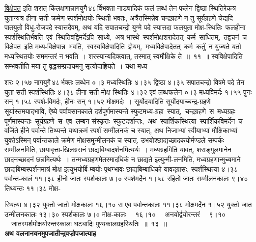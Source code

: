 \documentclass[11pt, openany]{book}
\begin{document}
\hyperref[4.11.1]{विक्षेपत} इति शरात् किंलक्षणान्नागयुगै\textendash \,४८\textendash \,र्विभक्ता नाड्यादिकं फलं लब्धं तेन फलेन द्विष्ठा स्थितिरेकत्र युतान्यत्र हीना सती क्रमेण स्पर्शमोक्षयोः स्थिती भवतः, अत्रैतस्मिन्नेव चन्द्रग्रहणे न तु सूर्यग्रहणे चेद्यदि पातयुतो विधु-रोजपदे स्यात्तदैवम्, अथ यदि सपातचन्द्रो युग्मे पदे स्यात्तदा फलयुता मोक्ष-स्थितिः \,फलहीना \,स्पर्शस्थितिर्भवति \,एवं \,स्थितिवद्विमर्देऽपि \,साध्ये, \,अत्र भास्थे \,स्पर्शमोक्षशरादेतत् \,कर्म \,साधितम्, \,तद्वचनं \,च \,विक्षेपत \,इति मध्य-विक्षेपान्न \,भवति, \,स्वस्वविक्षेपादिति \,ज्ञेयम्, \,मध्यविक्षेपादेतत् \,कर्म \,कर्तुं \,न युज्यते यतो मध्यस्थितयोः सममन्तरं न भवति~। शरस्यान्यदिक्त्वात्, तस्मात् स्वमौक्षिके ते~॥~११~॥ स्वविक्षेपादिति सम्भवतीति मया तु वृद्धसम्प्रदायमनु-सृत्योदाह्रियते~। यथा मध्य-

\newpage

\noindent शरः २।५७ नागयुगै\textendash \,४८\textendash \,र्भक्तः लब्धेन ०।३ मध्यस्थितिः ४।३५ द्विष्ठा ४।३५ सपातचन्द्रो विषमे पदे तेन युता सती स्पर्शस्थितिः ४।३८ हीना सती मोक्ष-स्थितिः ४।३२ एवं लब्धफलेन ०।३ मध्यविमर्दः १।५५ पुनः सन् १।५८ स्पर्श-विमर्दः, हीनः सन् १।५२ मोक्षमर्दः~। सूर्योदयादिति सूर्योदयाच्चन्द्र-ग्रहणे सूर्यास्तमयाद्भावि, ऐष्ये पर्वावसानकाले दर्शपूर्णमास्यन्ते स्फुटमध्य-ग्रहा \,स्यात्, \,चन्द्रग्रहणे \,स \,मध्यग्रहः \,पूर्णमास्यन्तः \,सूर्यग्रहणे \,स \,एव \,लम्बन-संस्कृतः \,स्फुटदर्शान्तः, \,अथ \,स्पार्शिकस्थित्या \,स्पार्शिकविमर्देन \,च \,वर्जिते हीने पर्वान्ते तिथ्यन्ते यथाक्रमं स्पर्शं सम्मीलनकं च स्यात्, अथ निजाभ्यां स्वीयाभ्यां मौक्षिकाभ्यां युक्तेऽस्मिन् पर्वान्तकाले क्रमेण मोक्षसमुन्मीलनकं च स्यात्, उभयोश्छाद्यच्छादकयोर्मण्डले सम्पर्कः सम्मीलनमिति, छायावृत्ता-खिलग्रसनं छाद्यबिम्बादर्शनमित्यर्थः~। मध्यग्रहमिति यावत्, शराङ्गुलमानेन छादनच्छादनं छन्नमित्यर्थः~। तन्मध्यग्रहणमेतस्मादधिकं न छाद्यते इत्युन्मी-लनमिति, \;मध्यग्रहणान्मुच्यमाने \;छाद्यबिम्बस्पर्शनमात्रं \;मोक्ष \;इत्युभयोर्बि-म्बयोः पृथग्भावः छाद्यबिम्बाधिको यावद्ग्रासः, स्पर्शस्थित्या ४।३८ पर्वान्त-कालं ११।३८ हीनो जातः स्पर्शकालः ७।० स्पर्शमर्देन १।५८ रहितो जातः सम्मीलनकालः ९।४० तिथ्यन्तः ११।३८ मोक्ष-

\newpage

\noindent स्थित्या ४।३२ युक्तो जातो मोक्षकालः १६।१० स एव पर्वान्तकालः ११।३८ मोक्षमर्देन १।५२ युक्तो जात उन्मीलनकालः १३।३० स्पर्शकालः ७।० मोक्ष-कालः ~~१६।१० ~~अनयोर्द्वयोरन्तरं ~~९।१० ~~जातस्पर्शमोक्षयोरन्तरकालः घट्यादिः पुण्यकालग्रहस्थितिः~॥~१३~॥\\

{\small \textbf{अथ वलनानयनमुपजातीन्द्रवज्रोपजात्याह\textendash }}
\end{document}

